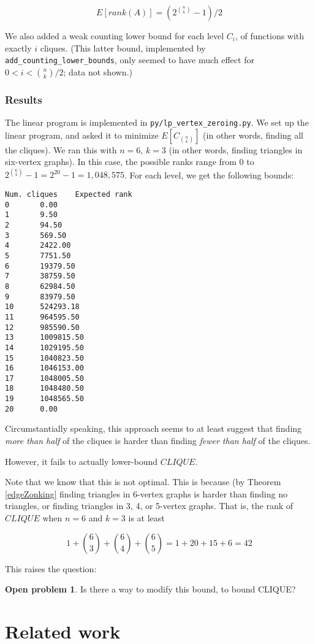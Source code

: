 \documentclass[12pt]{article}
\theoremstyle{definition}
\newtheorem{prob}{Open problem}[section]
\begin{document}
\[
E[rank(A)] = (2^{n \choose k} - 1) / 2
\]

We also added a weak counting lower bound for each level $C_i$, of functions
with exactly $i$ cliques. (This latter bound, implemented by
{\tt add\_counting\_lower\_bounds}, only seemed to have much
effect for $0 < i < {n \choose k}/2$; data not shown.)

\subsubsection{Results}

The linear program is implemented in {\tt py/lp\_vertex\_zeroing.py}.
We set up the linear program, and asked it to minimize $E[C_{n \choose k}]$
(in other words, finding all the cliques). We ran this with $n=6$, $k=3$
(in other words, finding triangles in six-vertex graphs). In this case,
the possible ranks range from $0$ to $2^{6 \choose 3}-1 = 2^{20}-1 = 1,048,575$.
For each level, we get the following bounds:

\begin{verbatim}
Num. cliques    Expected rank
0		0.00
1		9.50
2		94.50
3		569.50
4		2422.00
5		7751.50
6		19379.50
7		38759.50
8		62984.50
9		83979.50
10		524293.18
11		964595.50
12		985590.50
13		1009815.50
14		1029195.50
15		1040823.50
16		1046153.00
17		1048005.50
18		1048480.50
19		1048565.50
20		0.00
\end{verbatim}

Circumstantially speaking, this approach seems to at least suggest
that finding {\em more than half} of the cliques is harder than finding
{\em fewer than half} of the cliques.

However, it fails to actually lower-bound $CLIQUE$.

Note that we know that this is not optimal. This is because (by
Theorem \ref{edgeZonking}
 finding triangles in 6-vertex graphs is harder than
finding no triangles, or finding triangles
in 3, 4, or 5-vertex graphs. That is, the rank of $CLIQUE$ when $n=6$
and $k=3$ is at least

\[
1 + {6 \choose 3} + {6 \choose 4} + {6 \choose 5} = 1 + 20 + 15 + 6 = 42
\]

This raises the question:

\begin{prob}
\label{lpRepair}
Is there a way to modify this bound, to bound CLIQUE?
\end{prob}

\section{Related work}
\end{document}
